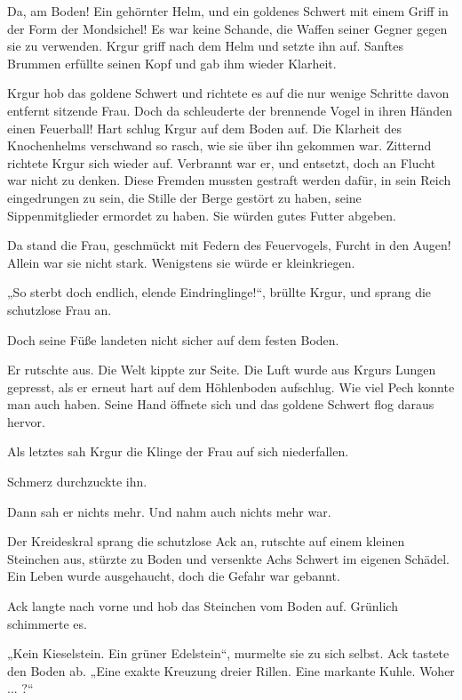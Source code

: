Da, am Boden! Ein gehörnter Helm, und ein goldenes Schwert mit einem Griff in der Form der Mondsichel! Es war keine Schande, die Waffen seiner Gegner gegen sie zu verwenden. Krgur griff nach dem Helm und setzte ihn auf. Sanftes Brummen erfüllte seinen Kopf und gab ihm wieder Klarheit.

Krgur hob das goldene Schwert und richtete es auf die nur wenige Schritte davon entfernt sitzende Frau. Doch da schleuderte der brennende Vogel in ihren Händen einen Feuerball! Hart schlug Krgur auf dem Boden auf. Die Klarheit des Knochenhelms verschwand so rasch, wie sie über ihn gekommen war. Zitternd richtete Krgur sich wieder auf. Verbrannt war er, und entsetzt, doch an Flucht war nicht zu denken. Diese Fremden mussten gestraft werden dafür, in sein Reich eingedrungen zu sein, die Stille der Berge gestört zu haben, seine Sippenmitglieder ermordet zu haben. Sie würden gutes Futter abgeben.

Da stand die Frau, geschmückt mit Federn des Feuervogels, Furcht in den Augen! Allein war sie nicht stark. Wenigstens sie würde er kleinkriegen.

„So sterbt doch endlich, elende Eindringlinge!“, brüllte Krgur, und sprang die schutzlose Frau an.

Doch seine Füße landeten nicht sicher auf dem festen Boden.

Er rutschte aus. Die Welt kippte zur Seite. Die Luft wurde aus Krgurs Lungen gepresst, als er erneut hart auf dem Höhlenboden aufschlug. Wie viel Pech konnte man auch haben. Seine Hand öffnete sich und das goldene Schwert flog daraus hervor.

Als letztes sah Krgur die Klinge der Frau auf sich niederfallen.

Schmerz durchzuckte ihn.

Dann sah er nichts mehr. Und nahm auch nichts mehr war.\bigskip







Der Kreideskral sprang die schutzlose Ack an, rutschte auf einem kleinen Steinchen aus, stürzte zu Boden und versenkte Achs Schwert im eigenen Schädel. Ein Leben wurde ausgehaucht, doch die Gefahr war gebannt.

Ack langte nach vorne und hob das Steinchen vom Boden auf. Grünlich schimmerte es.

„Kein Kieselstein. Ein grüner Edelstein“, murmelte sie zu sich selbst. Ack tastete den Boden ab. „Eine exakte Kreuzung dreier Rillen. Eine markante Kuhle. Woher ... ?“

